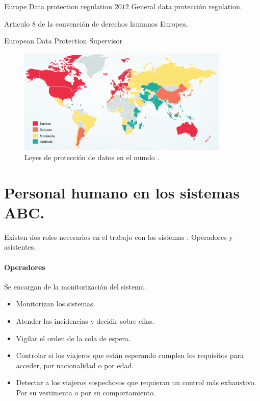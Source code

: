 Europe Data protection regulation $2012$ General data protección regulation.

Articulo 8 de la convención de derechos humanos Europea.

European Data Protection Supervisor
\color{black}

\begin{figure}[t]
    \centering
    \includegraphics[width=0.9\textwidth]{ch-sistemasABC/images/ch-SistemasABC/proteccionDatosPaises.png}
    \caption{Leyes de protección de datos en el mundo \cite{DLAPiperOnline}.}
    \label{fig:mapaLeyesProteccionDatos}
\end{figure}


\section{Personal humano en los sistemas ABC.}\label{sec:PersonalABC}

Existen dos roles necesarios en el trabajo con los sistemas : Operadores y asistentes.

\paragraph{Operadores\\}

Se encargan de la monitorización del sistema.

\begin{itemize}
    \item
    Monitorizan los sistemas.
    \item
    Atender las incidencias y decidir sobre ellas.
    \item
    Vigilar el orden de la cola de espera.
    \item
    Controlar si los viajeros que están esperando cumplen los requisitos para acceder, por nacionalidad o por edad.
    \item
    Detectar a los viajeros sospechosos que requieran un control más exhaustivo. Por su vestimenta o por su comportamiento.
\end{itemize}

